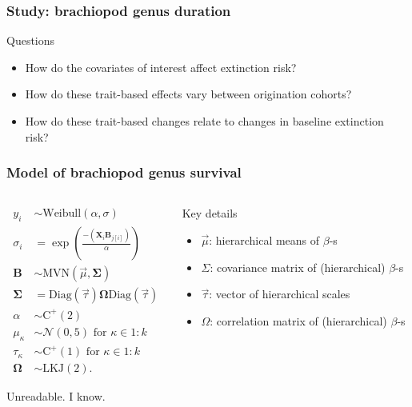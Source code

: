 \documentclass{beamer}
\begin{document}
\begin{frame}
  \frametitle{Study: brachiopod genus duration}
  \begin{alertblock}{Questions}
    \begin{itemize}
      \item How do the covariates of interest affect extinction risk?
      \item How do these trait-based effects vary between origination cohorts?
      \item How do these trait-based changes relate to changes in baseline extinction risk?
    \end{itemize}
  \end{alertblock}
\end{frame}

\begin{frame}
  \frametitle{Model of brachiopod genus survival}
  \begin{columns}
    \begin{column}{0.5\textwidth}
      \begin{align*}
        y_{i} &\sim \mathrm{Weibull}(\alpha, \sigma) \\
        \sigma_{i} &= \exp\left(\frac{-(\mathbf{X}_{i} \mathbf{B}_{j[i]})}{\alpha}\right) \\
        \mathbf{B} &\sim \mathrm{MVN}(\vec{\mu}, \mathbf{\Sigma}) \\
        \mathbf{\Sigma} &= \text{Diag}(\vec{\tau}) \mathbf{\Omega} \text{Diag}(\vec{\tau}) \\
        \alpha &\sim \mathrm{C^{+}}(2) \\
        \mu_{\kappa} &\sim \mathcal{N}(0, 5) \text{ for } \kappa \in 1:k \\
        \tau_{\kappa} &\sim \mathrm{C^{+}}(1) \text{ for } \kappa \in 1:k \\
        \mathbf{\Omega} &\sim \text{LKJ}(2).
      \end{align*}

      \bigskip

      \footnotesize{Unreadable. I know.}
    \end{column}
    \begin{column}{0.5\textwidth}
      Key details
      \begin{itemize}
        \item \(\vec{\mu}\): hierarchical means of \(\beta\)-s
        \item \(\Sigma\): covariance matrix of (hierarchical) \(\beta\)-s
        \item \(\vec{\tau}\): vector of hierarchical scales
        \item \(\Omega\): correlation matrix of (hierarchical) \(\beta\)-s
      \end{itemize}
      
    \end{column}
  \end{columns}
\end{frame}
\end{document}
